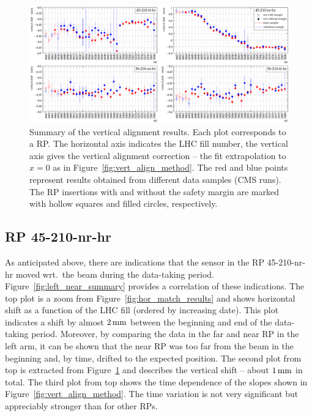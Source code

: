 \documentclass[TOTEM]{cern/cernphprep}
\def\un#1{\,{\rm #1}}
\begin{document}
\begin{figure}[h!]
\begin{center}
\includegraphics[width=\hsize]{fig/physics_fills/final_alignment_y_cmp_ph_sample.pdf}
\caption{%
Summary of the vertical alignment results. Each plot corresponds to a RP. The horizontal axis indicates the LHC fill number, the vertical axis gives the vertical alignment correction -- the fit extrapolation to $x=0$ as in Figure~\ref{fig:vert_align_method}. The red and blue points represent results obtained from different data samples (CMS runs). The RP insertions with and without the safety margin are marked with hollow squares and filled circles, respectively.
}
\label{fig:vert_align_results}
\end{center}
\end{figure}



\subsection{RP 45-210-nr-hr}
\label{s:phys-left-near}

As anticipated above, there are indications that the sensor in the RP 45-210-nr-hr moved wrt.~the beam during the data-taking period. Figure~\ref{fig:left_near_summary} provides a correlation of these indications. The top plot is a zoom from Figure~\ref{fig:hor_match_results} and shows horizontal shift as a function of the LHC fill (ordered by increasing date). This plot indicates a shift by almost $2\un{mm}$ between the beginning and end of the data-taking period. Moreover, by comparing the data in the far and near RP in the left arm, it can be shown that the near RP was too far from the beam in the beginning and, by time, drifted to the expected position. The second plot from top is extracted from Figure~\ref{fig:vert_align_results} and describes the vertical shift -- about $1\un{mm}$ in total. The third plot from top shows the time dependence of the slopes shown in Figure~\ref{fig:vert_align_method}. The time variation is not very significant but appreciably stronger than for other RPs.
\end{document}
